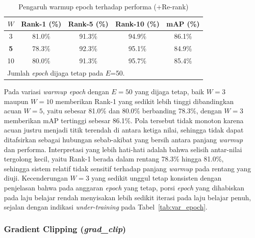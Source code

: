 \begin{table}[H]
    \centering
    \caption{Pengaruh warmup epoch terhadap performa (+Re-rank)}
    \label{tab:var_warmup}
    \renewcommand{\arraystretch}{1.25}
    \begin{tabular}{ccccc}
        \hline
        $W$        & \textbf{Rank-1 (\%)} & \textbf{Rank-5 (\%)} & \textbf{Rank-10 (\%)} & \textbf{mAP (\%)} \\
        \hline
        3          & 81.0\%               & 91.3\%               & 94.9\%                & 86.1\%            \\
        \textbf{5} & 78.3\%               & 92.3\%               & 95.1\%                & 84.9\%            \\
        10         & 80.0\%               & 91.3\%               & 95.7\%                & 85.4\%            \\
        \hline
        \multicolumn{5}{l}{\footnotesize Jumlah \textit{epoch} dijaga tetap pada $E$=50.}                    \\
    \end{tabular}
\end{table}

Pada variasi \textit{warmup epoch} dengan $E=50$ yang dijaga tetap, baik $W=3$ maupun $W=10$ memberikan Rank-1 yang sedikit lebih tinggi dibandingkan acuan $W=5$, yaitu sebesar 81.0\% dan 80.0\% berbanding 78.3\%, dengan $W=3$ memberikan mAP tertinggi sebesar 86.1\%. Pola tersebut tidak monoton karena acuan justru menjadi titik terendah di antara ketiga nilai, sehingga tidak dapat ditafsirkan sebagai hubungan sebab-akibat yang bersih antara panjang \textit{warmup} dan performa. Interpretasi yang lebih hati-hati adalah bahwa selisih antar-nilai tergolong kecil, yaitu Rank-1 berada dalam rentang 78.3\% hingga 81.0\%, sehingga sistem relatif tidak sensitif terhadap panjang \textit{warmup} pada rentang yang diuji. Kecenderungan $W=3$ yang sedikit unggul tetap konsisten dengan penjelasan bahwa pada anggaran \textit{epoch} yang tetap, porsi \textit{epoch} yang dihabiskan pada laju belajar rendah menyisakan lebih sedikit iterasi pada laju belajar penuh, sejalan dengan indikasi \textit{under-training} pada Tabel~\ref{tab:var_epoch}.

\subsubsection{Gradient Clipping (\textit{grad\_clip})}

